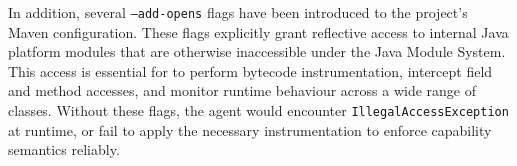 In addition, several \texttt{--add-opens} flags have been introduced to the project's Maven configuration. These flags explicitly grant reflective access to internal Java platform modules that are otherwise inaccessible under the Java Module System. This access is essential for \jdala to perform bytecode instrumentation, intercept field and method accesses, and monitor runtime behaviour across a wide range of classes. Without these flags, the agent would encounter \texttt{IllegalAccessException} at runtime, or fail to apply the necessary instrumentation to enforce capability semantics reliably.

